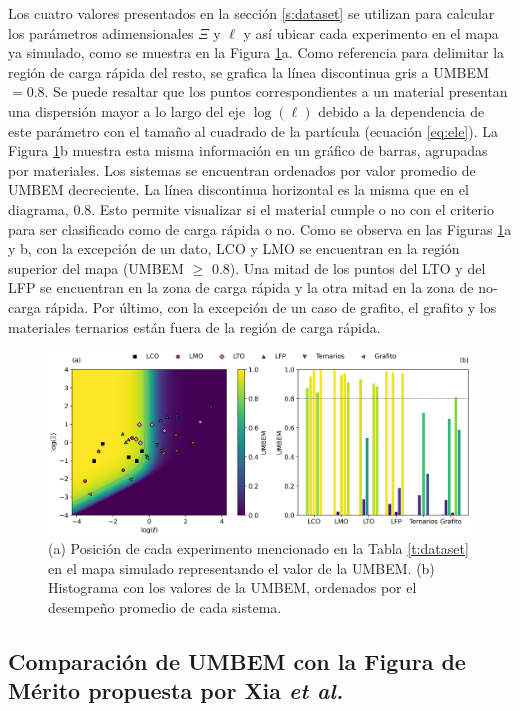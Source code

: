 Los cuatro valores presentados en la sección \ref{s:dataset} se utilizan para calcular los parámetros adimensionales 
$\Xi$ y $\ell$ y así ubicar cada experimento en el mapa ya simulado, como se muestra
en la Figura \ref{fig:UMBEM}a. Como referencia para delimitar la región de carga
rápida del resto, se grafica la línea discontinua gris a UMBEM$ = 0.8$. Se puede
resaltar que los puntos correspondientes a un material presentan una 
dispersión mayor a lo largo del eje $\log(\ell)$ debido a la dependencia de este
parámetro con el tamaño al cuadrado de la partícula (ecuación \ref{eq:ele}). La
Figura \ref{fig:UMBEM}b muestra esta misma información en un gráfico de barras,
agrupadas por materiales. Los sistemas se encuentran ordenados por valor promedio 
de UMBEM decreciente. La línea discontinua horizontal es la misma que
en el diagrama, 0.8. Esto permite visualizar si el material cumple o no con el
criterio para ser clasificado como de carga rápida o no. Como se observa en las
Figuras \ref{fig:UMBEM}a y b, con la excepción de un dato, LCO y LMO se encuentran
en la región superior del mapa (UMBEM $\geq$ 0.8). Una mitad de los puntos del 
LTO y del LFP se encuentran en la zona de carga rápida y la otra mitad en la zona
de no-carga rápida. Por último, con la excepción de un caso de grafito, el grafito
y los materiales ternarios están fuera de la región de carga rápida.
\begin{figure}[h!]
    \centering
    \includegraphics[width=\textwidth]{FastCharging/umbem/UMBEM.png}
    \caption{(a) Posición de cada experimento mencionado en la Tabla 
    \ref{t:dataset} en el mapa simulado representando el valor de la UMBEM. (b)
    Histograma con los valores de la UMBEM, ordenados por el desempeño promedio
    de cada sistema.}
    \label{fig:UMBEM}
\end{figure}

\subsection{Comparación de UMBEM con la Figura de Mérito propuesta por Xia \textit{et al.}}

